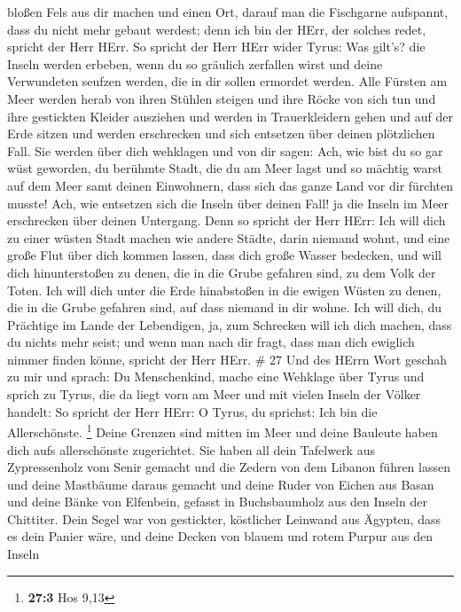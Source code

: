 bloßen Fels aus dir machen und einen Ort, darauf man die Fischgarne
aufspannt, dass du nicht mehr gebaut werdest; denn ich bin der HErr, der
solches redet, spricht der Herr HErr.  So spricht der Herr
HErr wider Tyrus: Was gilt's? die Inseln werden erbeben, wenn du so
gräulich zerfallen wirst und deine Verwundeten seufzen werden, die in
dir sollen ermordet werden.  Alle Fürsten am Meer werden
herab von ihren Stühlen steigen und ihre Röcke von sich tun und ihre
gestickten Kleider ausziehen und werden in Trauerkleidern gehen und auf
der Erde sitzen und werden erschrecken und sich entsetzen über deinen
plötzlichen Fall.  Sie werden über dich wehklagen und von
dir sagen: Ach, wie bist du so gar wüst geworden, du berühmte Stadt, die
du am Meer lagst und so mächtig warst auf dem Meer samt deinen
Einwohnern, dass sich das ganze Land vor dir fürchten musste!
 Ach, wie entsetzen sich die Inseln über deinen Fall! ja
die Inseln im Meer erschrecken über deinen Untergang.  Denn
so spricht der Herr HErr: Ich will dich zu einer wüsten Stadt machen wie
andere Städte, darin niemand wohnt, und eine große Flut über dich kommen
lassen, dass dich große Wasser bedecken,  und will dich
hinunterstoßen zu denen, die in die Grube gefahren sind, zu dem Volk der
Toten. Ich will dich unter die Erde hinabstoßen in die ewigen Wüsten zu
denen, die in die Grube gefahren sind, auf dass niemand in dir wohne.
Ich will dich, du Prächtige im Lande der Lebendigen,  ja,
zum Schrecken will ich dich machen, dass du nichts mehr seist; und wenn
man nach dir fragt, dass man dich ewiglich nimmer finden könne, spricht
der Herr HErr. \# 27  Und des HErrn Wort geschah zu mir und
sprach:  Du Menschenkind, mache eine Wehklage über Tyrus
 und sprich zu Tyrus, die da liegt vorn am Meer und mit
vielen Inseln der Völker handelt: So spricht der Herr HErr: O Tyrus, du
sprichst: Ich bin die Allerschönste. \footnote{\textbf{27:3} Hos 9,13}
 Deine Grenzen sind mitten im Meer und deine Bauleute haben
dich aufs allerschönste zugerichtet.  Sie haben all dein
Tafelwerk aus Zypressenholz vom Senir gemacht und die Zedern von dem
Libanon führen lassen und deine Mastbäume daraus gemacht 
und deine Ruder von Eichen aus Basan und deine Bänke von Elfenbein,
gefasst in Buchsbaumholz aus den Inseln der Chittiter.  Dein
Segel war von gestickter, köstlicher Leinwand aus Ägypten, dass es dein
Panier wäre, und deine Decken von blauem und rotem Purpur aus den Inseln
